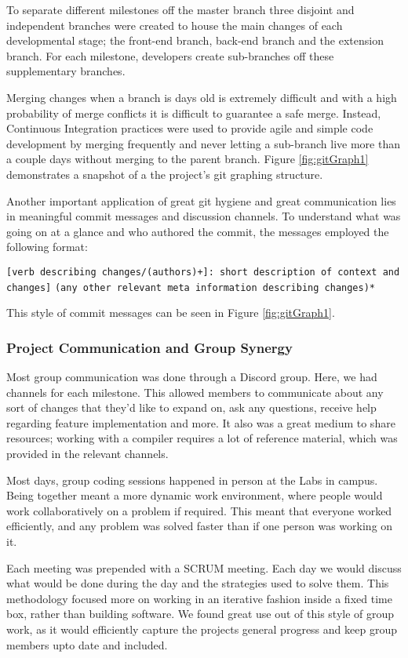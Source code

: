 \documentclass[a4paper,12pt]{article}
\begin{document}
To separate different milestones off the master branch three disjoint and independent branches were created to house the main changes of each developmental stage; the front-end branch, back-end branch and the extension branch. For each milestone, developers create sub-branches off these supplementary branches. 

Merging changes when a branch is days old is extremely difficult and with a high probability of merge conflicts it is difficult to guarantee a safe merge. Instead, Continuous Integration practices were used to provide agile and simple code development by merging frequently and never letting a sub-branch live more than a couple days without merging to the parent branch. Figure \ref{fig:gitGraph1} demonstrates a snapshot of a the project's git graphing structure.

Another important application of great git hygiene and great communication lies in meaningful commit messages and discussion channels. To understand what was going on at a glance and who authored the commit, the messages employed the following format:

\verb|[verb describing changes/(authors)+]: short description of context and changes]|
\verb|(any other relevant meta information describing changes)*|

This style of commit messages can be seen in Figure \ref{fig:gitGraph1}. 

\subsubsection*{Project Communication and Group Synergy}

Most group communication was done through a Discord group. Here, we had channels for each milestone. This allowed members to communicate about any sort of changes that they'd like to expand on, ask any questions, receive help regarding feature implementation and more. It also was a great medium to share resources; working with a compiler requires a lot of reference material, which was provided in the relevant channels.

Most days, group coding sessions happened in person at the Labs in campus. Being together meant a more dynamic work environment, where people would work collaboratively on a problem if required. This meant that everyone worked efficiently, and any problem was solved faster than if one person was working on it.

Each meeting was prepended with a SCRUM meeting. Each day we would discuss what would be done during the day and the strategies used to solve them. This methodology focused more on working in an iterative fashion inside a fixed time box, rather than building software. We found great use out of this style of group work, as it would efficiently capture the projects general progress and keep group members upto date and included.
\end{document}
